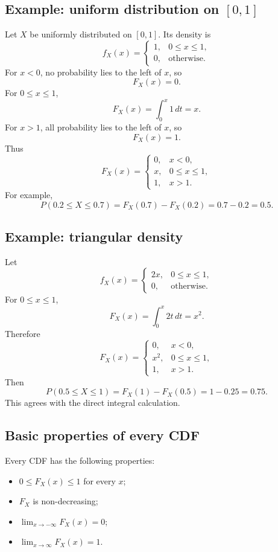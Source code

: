 \subsection*{Example: uniform distribution on \([0,1]\)}

Let \(X\) be uniformly distributed on \([0,1]\). Its density is
\[
f_X(x)=
\begin{cases}
1, & 0\leq x\leq 1,\\
0, & \text{otherwise}.
\end{cases}
\]
For \(x<0\), no probability lies to the left of \(x\), so
\[
F_X(x)=0.
\]
For \(0\leq x\leq 1\),
\[
F_X(x)=\int_0^x1\,dt=x.
\]
For \(x>1\), all probability lies to the left of \(x\), so
\[
F_X(x)=1.
\]
Thus
\[
F_X(x)=
\begin{cases}
0, & x<0,\\
x, & 0\leq x\leq 1,\\
1, & x>1.
\end{cases}
\]
For example,
\[
P(0.2\leq X\leq 0.7)=F_X(0.7)-F_X(0.2)=0.7-0.2=0.5.
\]

\subsection*{Example: triangular density}

Let
\[
f_X(x)=
\begin{cases}
2x, & 0\leq x\leq 1,\\
0, & \text{otherwise}.
\end{cases}
\]
For \(0\leq x\leq1\),
\[
F_X(x)=\int_0^x2t\,dt=x^2.
\]
Therefore
\[
F_X(x)=
\begin{cases}
0, & x<0,\\
x^2, & 0\leq x\leq 1,\\
1, & x>1.
\end{cases}
\]
Then
\[
P(0.5\leq X\leq 1)=F_X(1)-F_X(0.5)=1-0.25=0.75.
\]
This agrees with the direct integral calculation.

\subsection*{Basic properties of every CDF}

Every CDF has the following properties:
\begin{itemize}
    \item \(0\leq F_X(x)\leq1\) for every \(x\);
    \item \(F_X\) is non-decreasing;
    \item \(\lim_{x\to-\infty}F_X(x)=0\);
    \item \(\lim_{x\to\infty}F_X(x)=1\).
\end{itemize}

